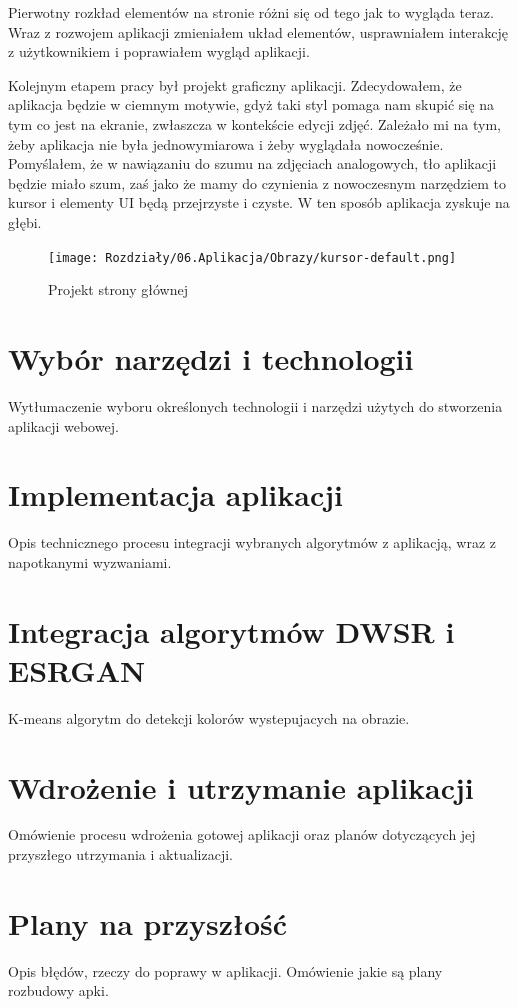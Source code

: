 Pierwotny rozkład elementów na stronie różni się od tego jak to wygląda teraz. Wraz z rozwojem aplikacji zmieniałem układ elementów, usprawniałem interakcję z użytkownikiem i poprawiałem wygląd aplikacji.

Kolejnym etapem pracy był projekt graficzny aplikacji. Zdecydowałem, że aplikacja będzie w ciemnym motywie, gdyż taki styl pomaga nam skupić się na tym co jest na ekranie, zwłaszcza w kontekście edycji zdjęć. Zależało mi na tym, żeby aplikacja nie była jednowymiarowa i żeby wyglądała nowocześnie. Pomyślałem, że w nawiązaniu do szumu na zdjęciach analogowych, tło aplikacji będzie miało szum, zaś jako że mamy do czynienia z nowoczesnym narzędziem to kursor i elementy UI będą przejrzyste i czyste. W ten sposób aplikacja zyskuje na głębi.

\begin{figure}[ht]
    \centering
    \begin{minipage}[t]{\linewidth}
        \texttt{[image: Rozdziały/06.Aplikacja/Obrazy/kursor-default.png]}  
        \caption{Projekt strony głównej}
        \label{fig:image85}
    \end{minipage}
\end{figure}










\section{Wybór narzędzi i technologii}

Wytłumaczenie wyboru określonych technologii i narzędzi użytych do stworzenia aplikacji webowej.




\section{Implementacja aplikacji}



Opis technicznego procesu integracji wybranych algorytmów z aplikacją, wraz z napotkanymi wyzwaniami.

\section{Integracja algorytmów DWSR i ESRGAN}

K-means algorytm do detekcji kolorów wystepujacych na obrazie.

\section{Wdrożenie i utrzymanie aplikacji}

Omówienie procesu wdrożenia gotowej aplikacji oraz planów dotyczących jej przyszłego utrzymania i aktualizacji.



\section{Plany na przyszłość}

Opis błędów, rzeczy do poprawy w aplikacji. Omówienie jakie są plany rozbudowy apki.